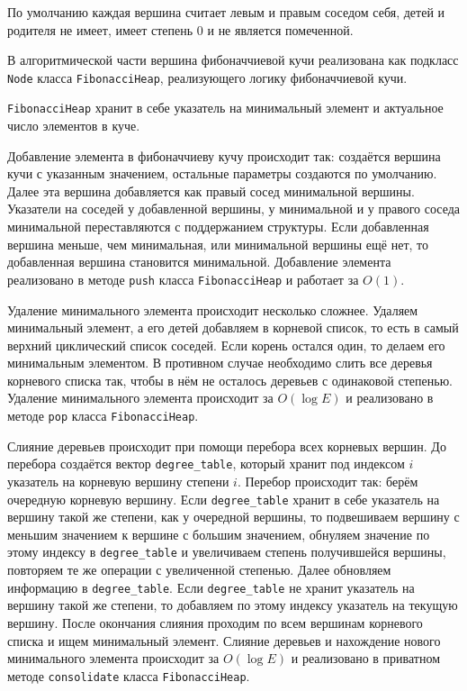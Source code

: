 	По умолчанию каждая вершина считает левым и правым соседом себя, детей и родителя не имеет, имеет степень $0$ и не является помеченной.
	
	В алгоритмической части вершина фибоначчиевой кучи реализована как подкласс \texttt{Node} класса \texttt{FibonacciHeap}, реализующего логику фибоначчиевой кучи.
	
	\texttt{FibonacciHeap} хранит в себе указатель на минимальный элемент и актуальное число элементов в куче.
	
	Добавление элемента в фибоначчиеву кучу происходит так: создаётся вершина кучи с указанным значением, остальные параметры создаются по умолчанию. Далее эта вершина добавляется как правый сосед минимальной вершины. Указатели на соседей у добавленной вершины, у минимальной и у правого соседа минимальной переставляются с поддержанием структуры. Если добавленная вершина меньше, чем минимальная, или минимальной вершины ещё нет, то добавленная вершина становится минимальной. Добавление элемента реализовано в методе \texttt{push} класса \texttt{FibonacciHeap} и работает за $O(1)$.
	
	Удаление минимального элемента происходит несколько сложнее. Удаляем минимальный элемент, а его детей добавляем в корневой список, то есть в самый верхний циклический список соседей. Если корень остался один, то делаем его минимальным элементом. В противном случае необходимо слить все деревья корневого списка так, чтобы в нём не осталось деревьев с одинаковой степенью. Удаление минимального элемента происходит за $O(\log E)$ и реализовано в методе \texttt{pop} класса \texttt{FibonacciHeap}. 
	
	Слияние деревьев происходит при помощи перебора всех корневых вершин. До перебора создаётся вектор \texttt{degree\_table}, который хранит под индексом $i$ указатель на корневую вершину степени $i$. Перебор происходит так: берём очередную корневую вершину. Если \texttt{degree\_table} хранит в себе указатель на вершину такой же степени, как у очередной вершины, то подвешиваем вершину с меньшим значением к вершине с большим значением, обнуляем значение по этому индексу в \texttt{degree\_table} и увеличиваем степень получившейся вершины, повторяем те же операции с увеличенной степенью. Далее обновляем информацию в \texttt{degree\_table}. Если \texttt{degree\_table} не хранит указатель на вершину такой же степени, то добавляем по этому индексу указатель на текущую вершину. После окончания слияния проходим по всем вершинам корневого списка и ищем минимальный элемент. Слияние деревьев и нахождение нового минимального элемента происходит за $O(\log E)$ и реализовано в приватном методе \texttt{consolidate} класса \texttt{FibonacciHeap}.
	
